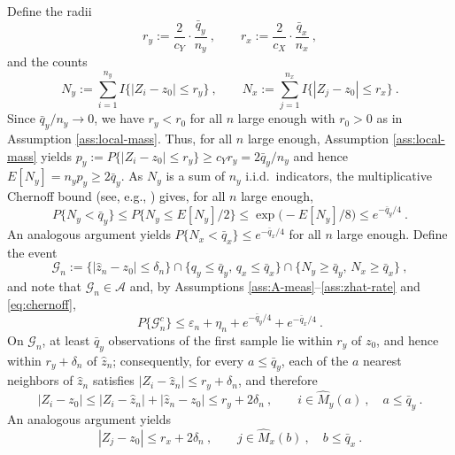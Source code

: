 \documentclass[11pt]{article}
\numberwithin{equation}{section}
\begin{document}
\medskip
{} Define the radii
\begin{equation}\label{eq:radii}
 r_y:=\frac{2}{c_Y}\cdot\frac{\bar q_y}{n_y}~,
 \qquad
 r_x:=\frac{2}{c_X}\cdot\frac{\bar q_x}{n_x}~,
\end{equation}
and the counts
\begin{equation*}
 N_y:=\sum_{i=1}^{n_y}I\{|Z_i-z_0|\le r_y\}~,
 \qquad
 N_x:=\sum_{j=1}^{n_x}I\{|Z_j-z_0|\le r_x\}~.
\end{equation*}
Since $\bar q_y/n_y\to0$, we have $r_y<r_0$ for all $n$ large enough with $r_0>0$ as in Assumption \ref{ass:local-mass}. Thus, for all $n$ large enough, Assumption \ref{ass:local-mass} yields $p_y:=P\{|Z_i-z_0|\le r_y\}\ge c_Y r_y=2\bar q_y/n_y$ and hence $E[N_y]=n_yp_y\ge2\bar q_y$. As $N_y$ is a sum of $n_y$ i.i.d.\ indicators, the multiplicative Chernoff bound (see, e.g., \citealp[Theorem 1.1]{dubhashi/panconesi:09}) gives, for all $n$ large enough,
\begin{equation}\label{eq:chernoff}
 P\{N_y<\bar q_y\}\le P\{N_y\le E[N_y]/2\}\le \exp\big(-E[N_y]/8\big)\le e^{-\bar q_y/4}~.
\end{equation}
An analogous argument yields $P\{N_x<\bar q_x\}\le e^{-\bar q_x/4}$ for all $n$ large enough. Define the event
\begin{equation}\label{eq:good-event}
 \mathcal{G}_n:=\big\{|\hat z_n-z_0|\le\delta_n\big\}\cap\big\{q_y\le\bar q_y,\,q_x\le\bar q_x\big\}
 \cap\big\{N_y\ge\bar q_y,\,N_x\ge\bar q_x\big\}~,
\end{equation}
and note that $\mathcal{G}_n\in\mathcal A$ and, by Assumptions
\ref{ass:A-meas}--\ref{ass:zhat-rate} and \eqref{eq:chernoff},
\begin{equation}\label{eq:good-prob}
 P\{\mathcal{G}_n^c\}\le\varepsilon_n+\eta_n+e^{-\bar q_y/4}+e^{-\bar q_x/4}~.
\end{equation}
On $\mathcal{G}_n$, at least $\bar q_y$ observations of the first sample lie within $r_y$ of
$z_0$, and hence within $r_y+\delta_n$ of $\hat z_n$; consequently, for every $a\le\bar q_y$, each of
the $a$ nearest neighbors of $\hat z_n$ satisfies $|Z_i-\hat z_n|\le r_y+\delta_n$, and therefore
\begin{equation}\label{eq:selected-radius}
 |Z_i-z_0|\le|Z_i-\hat z_n|+|\hat z_n-z_0|\le r_y+2\delta_n~,
 \qquad i\in\hat M_y(a)~,\quad a\le\bar q_y~.
\end{equation}
An analogous argument yields
\begin{equation}\label{eq:selected-radius2}
|Z_j-z_0|\le r_x+2\delta_n~,
 \qquad j\in\hat M_x(b)~,\quad b\le\bar q_x~.
\end{equation}
\end{document}

